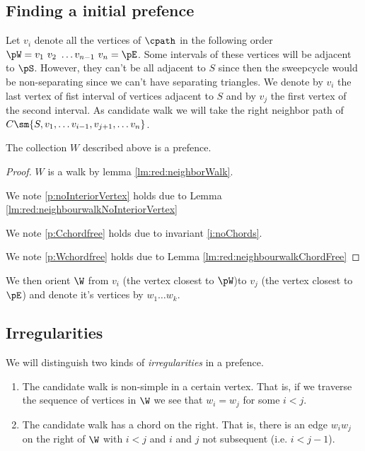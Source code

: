 \subsection{Finding a initial prefence}
  Let $v_i$ denote all the vertices of $\cpath$ in the following order $\pW =  v_1 \  v_2 \  \ldots v_{n-1} \  v_n = \pE$.
  Some intervals of these vertices will be adjacent to $\pS$. However, they can't be all adjacent to $S$ since then the sweepcycle would be non-separating since we can't have separating triangles. We denote by $v_i$ the last vertex of fist interval of vertices adjacent to $S$ and by $v_j$ the first vertex of the second interval.
  As candidate walk we will take the right neighbor path of $C\sm{S, v_1, \ldots v_{i-1}, v_{j+1}, \dots v_n}$.

  \begin{lemma}
    \label{lm:red:isPrefence}
  The collection $W$ described above is a prefence.
  \end{lemma}
  \begin{proof}
  $W$ is a walk by lemma \ref{lm:red:neighborWalk}.

  We note \ref{p:noInteriorVertex} holds due to Lemma \ref{lm:red:neighbourwalkNoInteriorVertex}

  We note \ref{p:Cchordfree} holds due to invariant \ref{i:noChords}.

  We note \ref{p:Wchordfree} holds due to Lemma \ref{lm:red:neighbourwalkChordFree}

  \end{proof}

  We then orient $\W$ from $v_i$ (the vertex closest to $\pW$)to $v_j$ (the vertex closest to $\pE$) and denote it's vertices by $w_1 \ldots w_k$.

\subsection{Irregularities}
  We will distinguish two kinds of \emph{irregularities} in a prefence.
  \begin{enumerate}
    \item The candidate walk is non-simple in a certain vertex. That is, if we traverse the sequence of vertices in $\W$ we see that $w_i = w_j$ for some $i<j$.
    \item The candidate walk has a chord on the right. That is, there is an edge $w_i w_j$ on the right of $\W$ with $i<j$ and $i$ and $j$ not subsequent (i.e. $i < j-1$).
  \end{enumerate}


